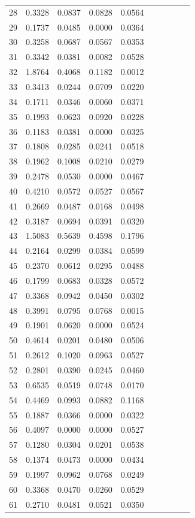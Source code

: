 \begin{table}
\begin{tabular}{cccccccccc}
28& 0.3328& 0.0837& 0.0828& 0.0564\\ 
29& 0.1737& 0.0485& 0.0000& 0.0364\\ 
30& 0.3258& 0.0687& 0.0567& 0.0353\\ 
31& 0.3342& 0.0381& 0.0082& 0.0528\\ 
32& 1.8764& 0.4068& 0.1182& 0.0012\\ 
33& 0.3413& 0.0244& 0.0709& 0.0220\\ 
34& 0.1711& 0.0346& 0.0060& 0.0371\\ 
35& 0.1993& 0.0623& 0.0920& 0.0228\\ 
36& 0.1183& 0.0381& 0.0000& 0.0325\\ 
37& 0.1808& 0.0285& 0.0241& 0.0518\\ 
38& 0.1962& 0.1008& 0.0210& 0.0279\\ 
39& 0.2478& 0.0530& 0.0000& 0.0467\\ 
40& 0.4210& 0.0572& 0.0527& 0.0567\\ 
41& 0.2669& 0.0487& 0.0168& 0.0498\\ 
42& 0.3187& 0.0694& 0.0391& 0.0320\\ 
43& 1.5083& 0.5639& 0.4598& 0.1796\\ 
44& 0.2164& 0.0299& 0.0384& 0.0599\\ 
45& 0.2370& 0.0612& 0.0295& 0.0488\\ 
46& 0.1799& 0.0683& 0.0328& 0.0572\\ 
47& 0.3368& 0.0942& 0.0450& 0.0302\\ 
48& 0.3991& 0.0795& 0.0768& 0.0015\\ 
49& 0.1901& 0.0620& 0.0000& 0.0524\\ 
50& 0.4614& 0.0201& 0.0480& 0.0506\\ 
51& 0.2612& 0.1020& 0.0963& 0.0527\\ 
52& 0.2801& 0.0390& 0.0245& 0.0460\\ 
53& 0.6535& 0.0519& 0.0748& 0.0170\\ 
54& 0.4469& 0.0993& 0.0882& 0.1168\\ 
55& 0.1887& 0.0366& 0.0000& 0.0322\\ 
56& 0.4097& 0.0000& 0.0000& 0.0527\\ 
57& 0.1280& 0.0304& 0.0201& 0.0538\\ 
58& 0.1374& 0.0473& 0.0000& 0.0434\\ 
59& 0.1997& 0.0962& 0.0768& 0.0249\\ 
60& 0.3368& 0.0470& 0.0260& 0.0529\\ 
61& 0.2710& 0.0481& 0.0521& 0.0350\\ 

\end{tabular}
\end{table}
